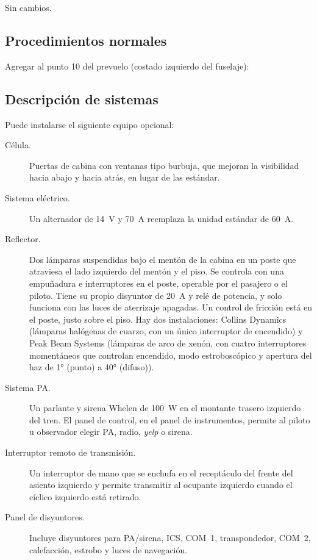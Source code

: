 Sin cambios.

\subsection{Procedimientos normales}

Agregar al punto 10 del prevuelo (costado izquierdo del fuselaje):

\begin{checklist}
\end{checklist}

\subsection{Descripción de sistemas}

Puede instalarse el siguiente equipo opcional:

\begin{description}
\item[Célula.] Puertas de cabina con ventanas tipo burbuja, que mejoran la visibilidad hacia abajo y hacia atrás, en lugar de las estándar.
\item[Sistema eléctrico.] Un alternador de 14~V y 70~A reemplaza la unidad estándar de 60~A.
\item[Reflector.] Dos lámparas suspendidas bajo el mentón de la cabina en un poste que atraviesa el lado izquierdo del mentón y el piso. Se controla con una empuñadura e interruptores en el poste, operable por el pasajero o el piloto. Tiene su propio disyuntor de 20~A y relé de potencia, y solo funciona con las luces de aterrizaje apagadas. Un control de fricción está en el poste, justo sobre el piso. Hay dos instalaciones: Collins Dynamics (lámparas halógenas de cuarzo, con un único interruptor de encendido) y Peak Beam Systems (lámparas de arco de xenón, con cuatro interruptores momentáneos que controlan encendido, modo estroboscópico y apertura del haz de 1° (punto) a 40° (difuso)).
\item[Sistema PA.] Un parlante y sirena Whelen de 100~W en el montante trasero izquierdo del tren. El panel de control, en el panel de instrumentos, permite al piloto u observador elegir PA, radio, \emph{yelp} o sirena.
\item[Interruptor remoto de transmisión.] Un interruptor de mano que se enchufa en el receptáculo del frente del asiento izquierdo y permite transmitir al ocupante izquierdo cuando el cíclico izquierdo está retirado.
\item[Panel de disyuntores.] Incluye disyuntores para PA/sirena, ICS, COM~1, transpondedor, COM~2, calefacción, estrobo y luces de navegación.
\end{description}

